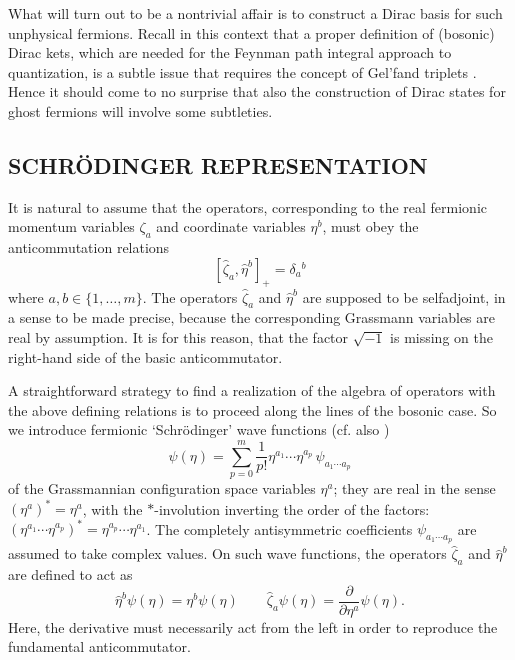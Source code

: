 \documentclass[a4paper,10pt]{article}
\begin{document}
What will turn out to be a nontrivial affair is to construct a Dirac basis for such 
unphysical fermions. Recall in this context that a proper definition of (bosonic) Dirac 
kets, which are needed for the Feynman path integral approach to quantization, is a subtle issue 
that requires the concept of Gel'fand triplets \cite{Gelf 64,Bohm 89}. Hence it should 
come to no surprise that also the construction of Dirac states for ghost fermions will 
involve some subtleties.

\subsection{SCHR\"{O}DINGER REPRESENTATION}

It is natural to assume that the operators, corresponding to the real fermionic momentum  
variables $\zeta_a$ and coordinate variables $\eta^b$, must obey the anticommutation 
relations
\begin{equation}\label{relationsunphysicalfermions}
[\hat{\zeta}_a,\hat{\eta}^b]_+=\delta_a{}^b
\end{equation}
where $a,b\in\{1,\ldots,m\}$. The operators $\hat{\zeta}_a$ and $\hat{\eta}^b$ are 
supposed to be selfadjoint, in a sense to be made precise, because the corresponding 
Grassmann variables are real by assumption. It is for this reason, that the factor 
$\sqrt{-1}$ is missing on the right-hand side of the basic anticommutator. 

A straightforward strategy to find a realization of the algebra of operators with the 
above defining relations is to proceed along the lines of the bosonic case. So we 
introduce fermionic `Schr\" odinger' wave functions (cf. also \cite{Thom 88,Holt 90})
\begin{equation}
\psi(\eta)=\sum_{p=0}^{m}\frac{1}{p!}\eta^{a_1}\cdots\eta^{a_p}\,\psi_{a_1\cdots a_p}
\end{equation}
of the Grassmannian configuration space variables $\eta^a$; they are real in the sense 
$(\eta^a)^{\ast}=\eta^a$, with the $\ast$-involution inverting the order of the factors: 
$(\eta^{a_1}\cdots\eta^{a_p})^{\ast}=\eta^{a_p}\cdots\eta^{a_1}$. The completely 
antisymmetric coefficients $\psi_{a_1\cdots a_p}$ are assumed to take complex values. On 
such wave functions, the operators $\hat{\zeta}_a$ and $\hat{\eta}^b$ are defined to act 
as
\begin{equation}\label{hatetajpsietaequaletajpsieta}
\hat{\eta}^b\psi(\eta)=\eta^b\psi(\eta)\qquad\hat{\zeta}_a\psi(\eta)=\frac{\partial}
{\partial\eta^a}\psi(\eta).
\end{equation}
Here, the derivative must necessarily act from the left in order to reproduce the 
fundamental anticommutator. 
\end{document}
